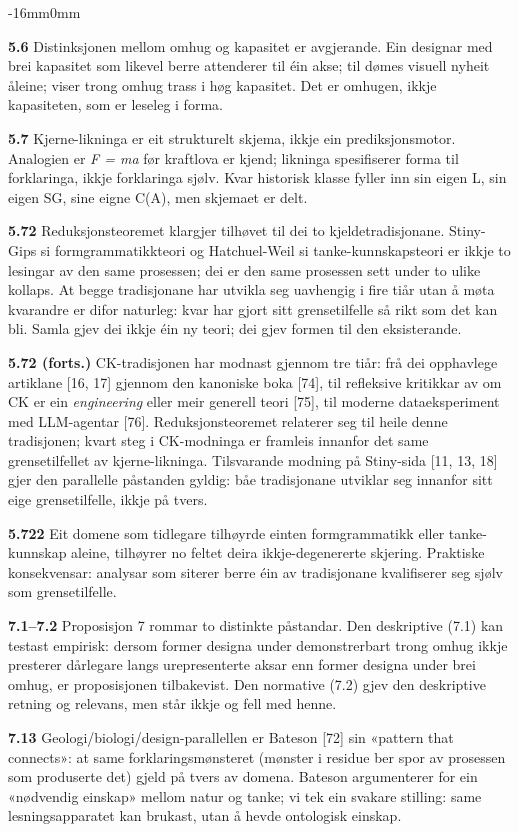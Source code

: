 \documentclass[10pt,oneside]{book}
\newcommand{\msym}[1]{{\mathfbfont #1}}
\newenvironment{widebody}{%
  \begin{adjustwidth}{-16mm}{0mm}%
}{%
  \end{adjustwidth}%
}
\begin{document}
\begin{widebody}
{\textbf{5.6} Distinksjonen mellom omhug og kapasitet er avgjerande. Ein designar med brei kapasitet som likevel berre attenderer til éin akse; til dømes visuell nyheit åleine; viser trong omhug trass i høg kapasitet. Det er omhugen, ikkje kapasiteten, som er leseleg i forma.

\textbf{5.7} Kjerne-likninga er eit strukturelt skjema, ikkje ein prediksjonsmotor. Analogien er \textit{F = ma} før kraftlova er kjend; likninga spesifiserer forma til forklaringa, ikkje forklaringa sjølv. Kvar historisk klasse fyller inn sin eigen \msym{L}, sin eigen SG, sine eigne C(A), men skjemaet er delt.

\textbf{5.72} Reduksjonsteoremet klargjer tilhøvet til dei to kjeldetradisjonane. Stiny-Gips si formgrammatikkteori og Hatchuel-Weil si tanke-kunnskapsteori er ikkje to lesingar av den same prosessen; dei er den same prosessen sett under to ulike kollaps. At begge tradisjonane har utvikla seg uavhengig i fire tiår utan å møta kvarandre er difor naturleg: kvar har gjort sitt grensetilfelle så rikt som det kan bli. Samla gjev dei ikkje éin ny teori; dei gjev formen til den eksisterande.

\textbf{5.72 (forts.)} CK-tradisjonen har modnast gjennom tre tiår: frå dei opphavlege artiklane [16, 17] gjennom den kanoniske boka [74], til refleksive kritikkar av om CK er ein \textit{engineering} eller meir generell teori [75], til moderne dataeksperiment med LLM-agentar [76]. Reduksjonsteoremet relaterer seg til heile denne tradisjonen; kvart steg i CK-modninga er framleis innanfor det same grensetilfellet av kjerne-likninga. Tilsvarande modning på Stiny-sida [11, 13, 18] gjer den parallelle påstanden gyldig: båe tradisjonane utviklar seg innanfor sitt eige grensetilfelle, ikkje på tvers.

\textbf{5.722} Eit domene som tidlegare tilhøyrde einten formgrammatikk eller tanke-kunnskap aleine, tilhøyrer no feltet deira ikkje-degenererte skjering. Praktiske konsekvensar: analysar som siterer berre éin av tradisjonane kvalifiserer seg sjølv som grensetilfelle.

\textbf{7.1--7.2} Proposisjon 7 rommar to distinkte påstandar. Den deskriptive (7.1) kan testast empirisk: dersom former designa under demonstrerbart trong omhug ikkje presterer dårlegare langs urepresenterte aksar enn former designa under brei omhug, er proposisjonen tilbakevist. Den normative (7.2) gjev den deskriptive retning og relevans, men står ikkje og fell med henne.

\textbf{7.13} Geologi/biologi/design-parallellen er Bateson [72] sin «pattern that connects»: at same forklaringsmønsteret (mønster i residue ber spor av prosessen som produserte det) gjeld på tvers av domena. Bateson argumenterer for ein «nødvendig einskap» mellom natur og tanke; vi tek ein svakare stilling: same lesningsapparatet kan brukast, utan å hevde ontologisk einskap.

}
\end{widebody}
\end{document}
